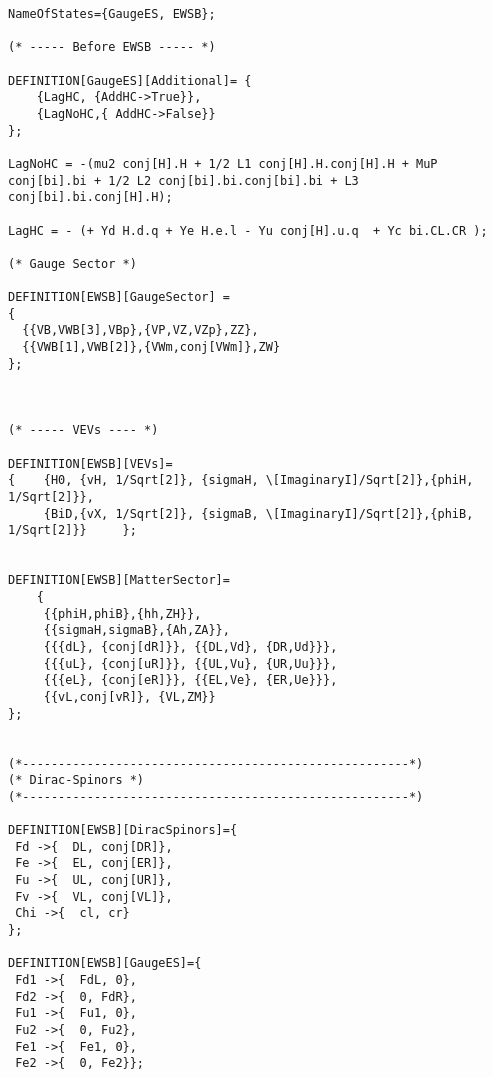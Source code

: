 \begin{lstlisting}
NameOfStates={GaugeES, EWSB};

(* ----- Before EWSB ----- *)

DEFINITION[GaugeES][Additional]= {
	{LagHC, {AddHC->True}},
	{LagNoHC,{ AddHC->False}}
};

LagNoHC = -(mu2 conj[H].H + 1/2 L1 conj[H].H.conj[H].H + MuP conj[bi].bi + 1/2 L2 conj[bi].bi.conj[bi].bi + L3 conj[bi].bi.conj[H].H);

LagHC = - (+ Yd H.d.q + Ye H.e.l - Yu conj[H].u.q  + Yc bi.CL.CR );

(* Gauge Sector *)

DEFINITION[EWSB][GaugeSector] =
{ 
  {{VB,VWB[3],VBp},{VP,VZ,VZp},ZZ},
  {{VWB[1],VWB[2]},{VWm,conj[VWm]},ZW}
};
        
          	

(* ----- VEVs ---- *)

DEFINITION[EWSB][VEVs]= 
{    {H0, {vH, 1/Sqrt[2]}, {sigmaH, \[ImaginaryI]/Sqrt[2]},{phiH, 1/Sqrt[2]}},
     {BiD,{vX, 1/Sqrt[2]}, {sigmaB, \[ImaginaryI]/Sqrt[2]},{phiB, 1/Sqrt[2]}}     };
 

DEFINITION[EWSB][MatterSector]=   
    {
     {{phiH,phiB},{hh,ZH}},
     {{sigmaH,sigmaB},{Ah,ZA}},
     {{{dL}, {conj[dR]}}, {{DL,Vd}, {DR,Ud}}},
     {{{uL}, {conj[uR]}}, {{UL,Vu}, {UR,Uu}}},
     {{{eL}, {conj[eR]}}, {{EL,Ve}, {ER,Ue}}},
     {{vL,conj[vR]}, {VL,ZM}}
};  


(*------------------------------------------------------*)
(* Dirac-Spinors *)
(*------------------------------------------------------*)

DEFINITION[EWSB][DiracSpinors]={
 Fd ->{  DL, conj[DR]},
 Fe ->{  EL, conj[ER]},
 Fu ->{  UL, conj[UR]},
 Fv ->{  VL, conj[VL]},
 Chi ->{  cl, cr}
};

DEFINITION[EWSB][GaugeES]={
 Fd1 ->{  FdL, 0},
 Fd2 ->{  0, FdR},
 Fu1 ->{  Fu1, 0},
 Fu2 ->{  0, Fu2},
 Fe1 ->{  Fe1, 0},
 Fe2 ->{  0, Fe2}};
 

\end{lstlisting}
